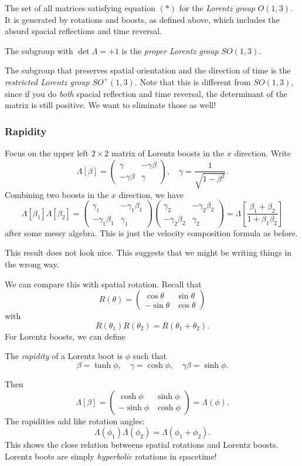 \documentclass[a4paper]{article}
\begin{document}
The set of all matrices satisfying equation $(*)$ for the \emph{Lorentz group} $O(1, 3)$. It is generated by rotations and boosts, as defined above, which includes the absurd spacial reflections and time reversal.

The subgroup with $\det \Lambda = +1$ is the \emph{proper Lorentz group} $SO(1, 3)$.

The subgroup that preserves spatial orientation and the direction of time is the \emph{restricted Lorentz group} $SO^+(1, 3)$. Note that this is different from $SO(1, 3)$, since if you do \emph{both} spacial reflection and time reversal, the determinant of the matrix is still positive. We want to eliminate those as well!

\subsubsection*{Rapidity}
Focus on the upper left $2\times 2$ matrix of Lorentz boosts in the $x$ direction. Write
\[
  \Lambda[\beta] =
  \begin{pmatrix}
    \gamma & -\gamma\beta\\
    -\gamma\beta & \gamma
  \end{pmatrix}
  ,\quad
  \gamma = \frac{1}{\sqrt{1 - \beta^2}}.
\]
Combining two boosts in the $x$ direction, we have
\[
  \Lambda[\beta_1]\Lambda[\beta_2] =
  \begin{pmatrix}
    \gamma_1 & -\gamma_1\beta_1\\
    -\gamma_1\beta_1 & \gamma_1
  \end{pmatrix}
  \begin{pmatrix}
    \gamma_2 & -\gamma_2\beta_2\\
    -\gamma_2\beta_2 & \gamma_2
  \end{pmatrix}
  = \Lambda\left[\frac{\beta_1 + \beta_2}{1 + \beta_1\beta_2}\right]
\]
after some messy algebra. This is just the velocity composition formula as before.

This result does not look nice. This suggests that we might be writing things in the wrong way.

We can compare this with spatial rotation. Recall that
\[
  R(\theta) =
  \begin{pmatrix}
    \cos \theta & \sin \theta\\
    -\sin \theta & \cos \theta
  \end{pmatrix}
\]
with
\[
  R(\theta_1)R(\theta_2) = R(\theta_1 + \theta_2).
\]
For Lorentz boosts, we can define
\begin{defi}[Rapidity]
  The \emph{rapidity} of a Lorentz boot is $\phi$ such that
  \[
    \beta = \tanh \phi,\quad \gamma = \cosh\phi,\quad \gamma\beta=\sinh \phi.
  \]
\end{defi}
Then
\[
  \Lambda[\beta] =
  \begin{pmatrix}
    \cosh \phi & \sinh \phi\\
    -\sinh \phi & \cosh \phi
  \end{pmatrix}
  = \Lambda(\phi).
\]
The rapidities add like rotation angles:
\[
  \Lambda(\phi_1)\Lambda(\phi_2) = \Lambda(\phi_1 + \phi_2).
\]
This shows the close relation betweens spatial rotations and Lorentz boosts. Lorentz boots are simply \emph{hyperbolic} rotations in spacetime!
\end{document}
